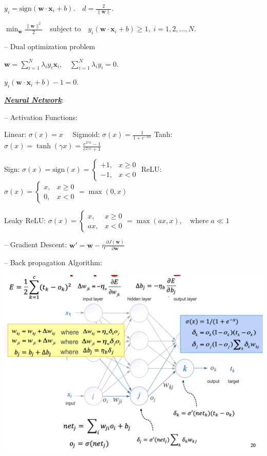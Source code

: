\documentclass[12pt]{article}
\newcommand{\bulletPoint}[1]{\ul{\textit{\textbf{#1}}}}
\begin{document}
\begin{multicols*}{2}
$ y_i = \text{sign}(\mathbf{w} \cdot \mathbf{x}_i + b). \quad d = \frac{2}{\|\mathbf{w}\|}. $

$ \min_{\mathbf{w}} \frac{\|\mathbf{w}\|^2}{2} \quad \text{subject to} \quad y_i(\mathbf{w} \cdot \mathbf{x}_i + b) \geq 1, \; i = 1, 2, \dots, N. $

–  Dual optimization problem

$ \mathbf{w} = \sum_{i=1}^N \lambda_i y_i \mathbf{x}_i, \quad \sum_{i=1}^N \lambda_i y_i = 0. $

$ y_i(\mathbf{w} \cdot \mathbf{x}_i + b) - 1 = 0. $


\bulletPoint{Neural Network}:

– Activation Functions:

Linear: $ \sigma(x) = x \quad$
Sigmoid: $ \sigma(x) = \frac{1}{1 + e^{-ax}} $ \quad Tanh: $ \sigma(x) = \tanh(\gamma x) = \frac{e^{2\gamma x} - 1}{e^{2\gamma x} + 1} $

Sign: $ \sigma(x) = \text{sign}(x) = 
\begin{cases} 
+1, & x \geq 0 \\
-1, & x < 0 
\end{cases} $ \quad ReLU: $ \sigma(x) = 
\begin{cases} 
x, & x \geq 0 \\
0, & x < 0 
\end{cases} = \max(0, x) $

Leaky ReLU: $ \sigma(x) = 
\begin{cases} 
x, & x \geq 0 \\
ax, & x < 0 
\end{cases} = \max(ax, x), \quad \text{where } a \ll 1 $

– Gradient Descent: 
$ \mathbf{w}' = \mathbf{w} - \eta \frac{\partial J(\mathbf{w})}{\partial \mathbf{w}} $

– Back propagation Algorithm:


\includegraphics[scale=0.38]{images/NN.png}


\end{multicols*}
\end{document}
